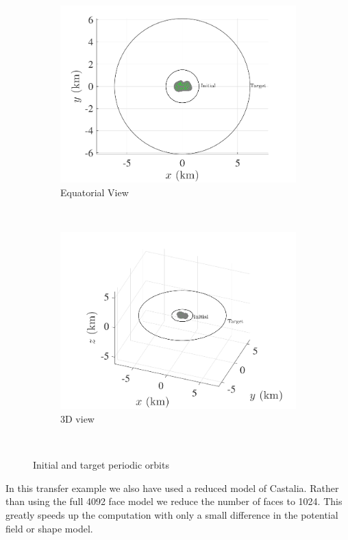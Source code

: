 \documentclass[]{aiaa-tc}%
\begin{document}
\begin{figure}[htbp]
    \centering 
    \begin{subfigure}[htbp]{0.45\textwidth} 
        \includegraphics[width=\textwidth]{initial_transfer} 
        \caption{Equatorial View} \label{fig:eq_initial_transfer} 
    \end{subfigure}~ %
    \begin{subfigure}[htbp]{0.45\textwidth} 
        \includegraphics[width=\textwidth]{initial_transfer_3d} 
        \caption{3D view} \label{fig:initial_transfer_3d} 
    \end{subfigure} ~ %
    \caption{Initial and target periodic orbits}
    \label{fig:initial_transfer} 
\end{figure}
In this transfer example we also have used a reduced model of Castalia.
Rather than using the full \num{4092} face model we reduce the number of faces to \num{1024}. 
This greatly speeds up the computation with only a small difference in the potential field or shape model.
\end{document}
